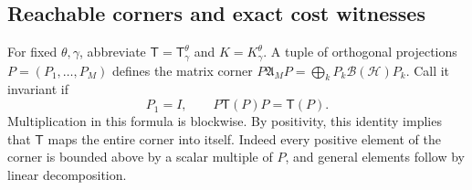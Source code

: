 \subsection{Reachable corners and exact cost witnesses}

For fixed $\theta,\gamma$, abbreviate $\mathsf T=\mathsf
T^\theta_\gamma$ and $K=K^\theta_\gamma$.  A tuple of orthogonal
projections $P=(P_1,\ldots,P_M)$ defines the matrix corner
$P\mathfrak A_MP=\bigoplus_kP_k\mathcal B(\mathcal H)P_k$.
Call it invariant if
\begin{equation}\label{eq:r79-corner-invariance}
 P_1=I,\qquad P\mathsf T(P)P=\mathsf T(P).
\end{equation}
Multiplication in this formula is blockwise.  By positivity, this
identity implies that $\mathsf T$ maps the entire corner into
itself.  Indeed every positive element of the corner is bounded
above by a scalar multiple of $P$, and general elements follow by
linear decomposition.

